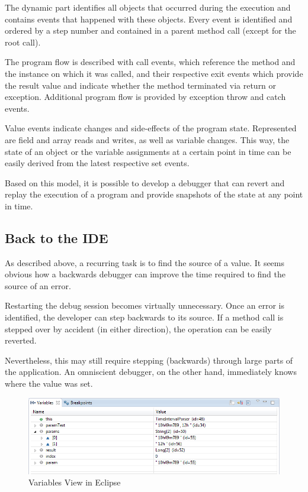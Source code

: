 \documentclass[english]{scrartcl}
\begin{document}
The dynamic part identifies all objects that occurred during the execution and contains events that happened with these objects.
Every event is identified and ordered by a step number and contained in a parent method call (except for the root call).

The program flow is described with call events, which reference the method and the instance on which it was called, and their respective exit events which provide the result value and indicate whether the method terminated via return or exception.
Additional program flow is provided by exception throw and catch events.

Value events indicate changes and side-effects of the program state.
Represented are field and array reads and writes, as well as variable changes.
This way, the state of an object or the variable assignments at a certain point in time can be easily derived from the latest respective set events.

Based on this model, it is possible to develop a debugger that can revert and replay the execution of a program and provide snapshots of the state at any point in time.


\subsection{Back to the IDE}

As described above, a recurring task is to find the source of a value.
It seems obvious how a backwards debugger can improve the time required to find the source of an error.

Restarting the debug session becomes virtually unnecessary.
Once an error is identified, the developer can step backwards to its source.
If a method call is stepped over by accident (in either direction), the operation can be easily reverted.

Nevertheless, this may still require stepping (backwards) through large parts of the application.
An omniscient debugger, on the other hand, immediately knows where the value was set.

\begin{figure}[ht]
\centering
\includegraphics[width=.8\textwidth]{img/variables.png}
\caption{Variables View in Eclipse}
\label{fig:variables}
\end{figure}
\end{document}
